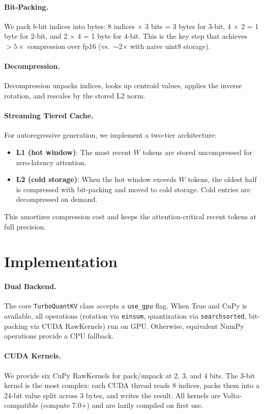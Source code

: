 \documentclass{article}
\begin{document}
\paragraph{Bit-Packing.}
We pack $b$-bit indices into bytes: 8 indices $\times$ 3 bits = 3 bytes
for 3-bit, 4 $\times$ 2 = 1 byte for 2-bit, and 2 $\times$ 4 = 1 byte
for 4-bit.  This is the key step that achieves $>5\times$ compression
over fp16 (vs.\ $\sim$2$\times$ with naive uint8 storage).

\paragraph{Decompression.}
Decompression unpacks indices, looks up centroid values, applies the
inverse rotation, and rescales by the stored L2 norm.

\paragraph{Streaming Tiered Cache.}
For autoregressive generation, we implement a two-tier architecture:
\begin{itemize}
  \item \textbf{L1 (hot window)}: The most recent $W$ tokens are stored
    uncompressed for zero-latency attention.
  \item \textbf{L2 (cold storage)}: When the hot window exceeds $W$
    tokens, the oldest half is compressed with bit-packing and moved to
    cold storage.  Cold entries are decompressed on demand.
\end{itemize}
This amortizes compression cost and keeps the attention-critical recent
tokens at full precision.

\section{Implementation}
\label{sec:impl}

\paragraph{Dual Backend.}
The core \texttt{TurboQuantKV} class accepts a \texttt{use\_gpu} flag.
When True and CuPy is available, all operations (rotation via
\texttt{einsum}, quantization via \texttt{searchsorted}, bit-packing via
CUDA RawKernels) run on GPU.  Otherwise, equivalent NumPy operations
provide a CPU fallback.

\paragraph{CUDA Kernels.}
We provide six CuPy RawKernels for pack/unpack at 2, 3, and 4 bits.
The 3-bit kernel is the most complex: each CUDA thread reads 8 indices,
packs them into a 24-bit value split across 3 bytes, and writes the
result.  All kernels are Volta-compatible (compute 7.0+) and are lazily
compiled on first use.
\end{document}
